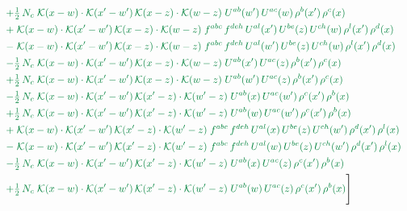 \documentclass[10pt]{article}
\numberwithin{equation}{section}
\begin{document}
\begin{align}
&\quad{\color{JIM}+\tfrac{1}{2}\,N_c\;\mathcal{K}(x-w)\cdot\mathcal{K}(x'-w')\,\mathcal{K}(x-z)\cdot\mathcal{K}(w-z)\;U^{ab}(w')\,U^{ac}(w)\,\rho^{b}(x')\,\rho^{c}(x)}\notag\\
&\quad{\color{JIM}+\;\mathcal{K}(x-w)\cdot\mathcal{K}(x'-w')\,\mathcal{K}(x-z)\cdot\mathcal{K}(w-z)\;f^{abc}\,f^{deh}\,U^{al}(x')\,U^{be}(z)\,U^{ch}(w)\,\rho^{l}(x')\,\rho^{d}(x)}\notag\\
&\quad{\color{JIM}-\;\mathcal{K}(x-w)\cdot\mathcal{K}(x'-w')\,\mathcal{K}(x-z)\cdot\mathcal{K}(w-z)\;f^{abc}\,f^{deh}\,U^{al}(w')\,U^{be}(z)\,U^{ch}(w)\,\rho^{l}(x')\,\rho^{d}(x)}\notag\\
&\quad{\color{JIM}-\tfrac{1}{2}\,N_c\;\mathcal{K}(x-w)\cdot\mathcal{K}(x'-w')\,\mathcal{K}(x-z)\cdot\mathcal{K}(w-z)\;U^{ab}(x')\,U^{ac}(z)\,\rho^{b}(x')\,\rho^{c}(x)}\notag\\
&\quad{\color{JIM}+\tfrac{1}{2}\,N_c\;\mathcal{K}(x-w)\cdot\mathcal{K}(x'-w')\,\mathcal{K}(x-z)\cdot\mathcal{K}(w-z)\;U^{ab}(w')\,U^{ac}(z)\,\rho^{b}(x')\,\rho^{c}(x)}\notag\\
&\quad{\color{JIM}-\tfrac{1}{2}\,N_c\;\mathcal{K}(x-w)\cdot\mathcal{K}(x'-w')\,\mathcal{K}(x'-z)\cdot\mathcal{K}(w'-z)\;U^{ab}(x)\,U^{ac}(w')\,\rho^{c}(x')\,\rho^{b}(x)}\notag\\
&\quad{\color{JIM}+\tfrac{1}{2}\,N_c\;\mathcal{K}(x-w)\cdot\mathcal{K}(x'-w')\,\mathcal{K}(x'-z)\cdot\mathcal{K}(w'-z)\;U^{ab}(w)\,U^{ac}(w')\,\rho^{c}(x')\,\rho^{b}(x)}\notag\\
&\quad{\color{JIM}+\;\mathcal{K}(x-w)\cdot\mathcal{K}(x'-w')\,\mathcal{K}(x'-z)\cdot\mathcal{K}(w'-z)\;f^{abc}\,f^{deh}\,U^{al}(x)\,U^{be}(z)\,U^{ch}(w')\,\rho^{d}(x')\,\rho^{l}(x)}\notag\\
&\quad{\color{JIM}-\;\mathcal{K}(x-w)\cdot\mathcal{K}(x'-w')\,\mathcal{K}(x'-z)\cdot\mathcal{K}(w'-z)\;f^{abc}\,f^{deh}\,U^{al}(w)\,U^{be}(z)\,U^{ch}(w')\,\rho^{d}(x')\,\rho^{l}(x)}\notag\\
&\quad{\color{JIM}-\tfrac{1}{2}\,N_c\;\mathcal{K}(x-w)\cdot\mathcal{K}(x'-w')\,\mathcal{K}(x'-z)\cdot\mathcal{K}(w'-z)\;U^{ab}(x)\,U^{ac}(z)\,\rho^{c}(x')\,\rho^{b}(x)}\notag\\
&\quad{\color{JIM}+\tfrac{1}{2}\,N_c\;\mathcal{K}(x-w)\cdot\mathcal{K}(x'-w')\,\mathcal{K}(x'-z)\cdot\mathcal{K}(w'-z)\;U^{ab}(w)\,U^{ac}(z)\,\rho^{c}(x')\,\rho^{b}(x)}\Bigg]\label{eq:gen1}
\end{align}
\end{document}
